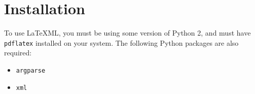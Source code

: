 \section{Installation}
  To use \LaTeX ML, you must be using some version of Python 2, and must have \texttt{pdflatex} installed on your system. The following Python packages are also required:
  
  \begin{itemize}
    \item \texttt{argparse}
    \item \texttt{xml}
  \end{itemize}